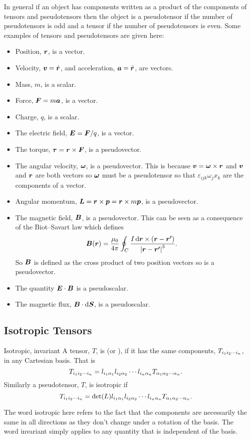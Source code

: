 In general if an object has components written as a product of the components of tensors and pseudotensors then the object is a pseudotensor if the number of pseudotensors is odd and a tensor if the number of pseudotensors is even.
Some examples of tensors and pseudotensors are given here:
\begin{itemize}
    \item Position, \(\bm{r}\), is a vector.
    \item Velocity, \(\bm{v} = \dot{\bm{r}}\), and acceleration, \(\bm{a} = \ddot{\bm{r}}\), are vectors.
    \item Mass, \(m\), is a scalar.
    \item Force, \(\bm{F} = m\bm{a}\), is a vector.
    \item Charge, \(q\), is a scalar.
    \item The electric field, \(\bm{E} = \bm{F}/q\), is a vector.
    \item The torque, \(\bm{\tau} = \bm{r}\times\bm{F}\), is a pseudovector.
    \item The angular velocity, \(\bm{\omega}\), is a pseudovector.
    This is because \(\bm{v} = \bm{\omega}\times\bm{r}\) and \(\bm{v}\) and \(\bm{r}\) are both vectors so \(\bm{\omega}\) must be a pseudotensor so that \(\varepsilon_{ijk}\omega_jx_k\) are the components of a vector.
    \item Angular momentum, \(\bm{L} = \bm{r}\times\bm{p} = \bm{r}\times m\bm{p}\), is a pseudovector.
    \item The magnetic field, \(\bm{B}\), is a pseudovector.
    This can be seen as a consequence of the Biot--Savart law which defines
    \[\bm{B}(\bm{r}) = \frac{\mu_0}{4\pi}\oint_C \frac{I\dd{\bm{r}\times(\bm{r} - \bm{r'})}}{\abs{\bm{r} - \bm{r'}}^3}.\]
    So \(\bm{B}\) is defined as the cross product of two position vectors so is a pseudovector.
    \item The quantity \(\bm{E}\cdot\bm{B}\) is a pseudoscalar.
    \item The magnetic flux, \(\bm{B}\cdot\dd{\bm{S}}\), is a pseudoscalar.
\end{itemize}

\subsection{Isotropic Tensors}
\begin{definition}{Isotropic, invariant}{}
    A tensor, \(T\), is  (or ), if it has the same components, \(T_{{ {i}_1 {i}_2 \dotsm {i}_{n} }}\), in any Cartesian basis.
    That is
    \[T_{{ {i}_1 {i}_2 \dotsm {i}_{n} }} = l_{i_1\alpha_1} l_{i_2\alpha_2}\dotsm l_{i_n\alpha_n} T_{{ {\alpha}_1 {\alpha}_2 \dotsm {\alpha}_{n} }}.\]
    Similarly a pseudotensor, \(T\), is isotropic if
    \[T_{{ {i}_1 {i}_2 \dotsm {i}_{n} }} = \det(L)l_{i_1\alpha_1} l_{i_2\alpha_2}\dotsm l_{i_n\alpha_n} T_{{ {\alpha}_1 {\alpha}_2 \dotsm {\alpha}_{n} }}.\]
\end{definition}
The word isotropic here refers to the fact that the components are necessarily the same in all directions as they don't change under a rotation of the basis.
The word invariant simply applies to any quantity that is independent of the basis.

